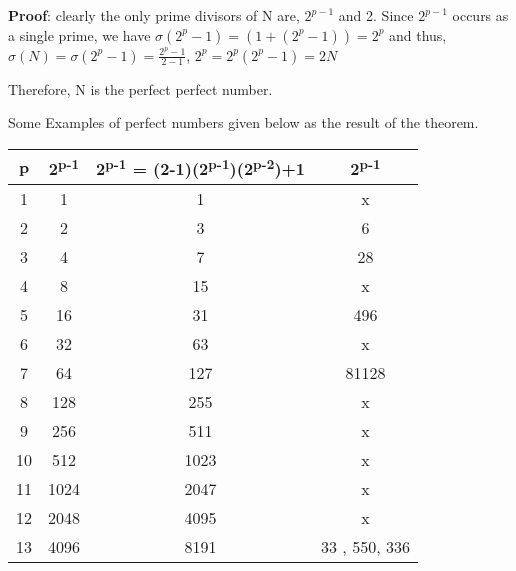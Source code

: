 \documentclass[12pt,,a4paper]{book}
\begin{document}
\textbf{Proof}: clearly the only prime divisors of N are, \(2^{p-1}\) and 2. Since \(2^{p-1}\) occurs as a single prime, we have \(\sigma(2^p-1) = (1 + (2^p-1)) = 2^p\) and thus, 
\(\sigma(N) = \sigma(2^p-1) = \frac{{2^p - 1}}{{2-1}}\), \(2^p = 2^p (2^p-1) = 2N\)

Therefore, N is the perfect perfect number.

Some Examples of perfect numbers given below  as the result of the theorem.
\vspace{20pt}


\begin{tabular}{|c|c|c|c|}
\hline
\textbf{p} & \textbf{2\textsuperscript{p-1}} & \textbf{2\textsuperscript{p-1} = (2-1)(2\textsuperscript{p-1})(2\textsuperscript{p-2})+1} & \textbf{2\textsuperscript{p-1}} \\
\hline
1 & 1 & 1 & x \\
\hline
2 & 2 & 3 & 6 \\
\hline
3 & 4 & 7 & 28 \\
\hline
4 & 8 & 15 & x \\
\hline
5 & 16 & 31 & 496 \\
\hline
6 & 32 & 63 & x \\
\hline
7 & 64 & 127 & 81128 \\
\hline
8 & 128 & 255 & x \\
\hline
9 & 256 & 511 & x \\
\hline
10 & 512 & 1023 & x \\
\hline
11 & 1024 & 2047 & x \\
\hline
12 & 2048 & 4095 & x \\
\hline
13 & 4096 & 8191 & 33 , 550, 336 \\
\hline
\end{tabular}

\vspace{20pt}
\newline 
\end{document}
